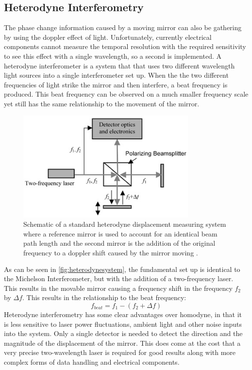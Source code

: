 \documentclass[12pt,a4paper,oneside]{report}
\begin{document}
	\subsection{Heterodyne Interferometry}
The phase change information caused by a moving mirror can also be gathering by using the doppler effect of light. Unfortunately, currently electrical components cannot measure the temporal resolution with the required sensitivity to see this effect with a single wavelength, so a second is implemented. A heterodyne interferometer is a system that that uses two different wavelength light sources into a single interferometer set up. When the the two different frequencies of light strike the mirror and then interfere, a beat frequency is produced. This beat frequency can be observed on a much smaller frequency scale yet still has the same relationship to the movement of the mirror.

\begin{figure}[H]
\includegraphics[width=0.8\textwidth, center,angle=0]{Images/heterodyne_system.jpg}
\caption{Schematic of a standard heterodyne displacement measuring system where a reference mirror is used to account for an identical beam path length and the second mirror is the addition of the original frequency to a doppler shift caused by the mirror moving \cite{HeterodyneInterferometer}.}
\label{fig:heterodynesystem}
\end{figure}

As can be seen in \autoref{fig:heterodynesystem}, the fundamental set up is identical to the Michelson Interferometer, but with the addition of a two-frequency laser. This results in the movable mirror causing a frequency shift in the frequency $f_{2}$ by $\Delta f$. This results in the relationship to the beat frequency:
\begin{equation}
f_{beat} = f_{1} - (f_{2} + \Delta f)
	\label{eq:dopplershift}
\end{equation}
Heterodyne interferometry has some clear advantages over homodyne, in that it is less sensitive to laser power fluctuations, ambient light and other noise inputs into the system. Only a single detector is needed to detect the direction and the magnitude of the displacement of the mirror. This does come at the cost that a very precise two-wavelength laser is required for good results along with more complex forms of data handling and electrical components.
    
\end{document}
